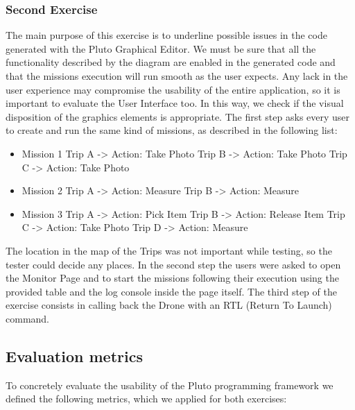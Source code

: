 \subsubsection{Second Exercise}

The main purpose of this exercise is to underline possible issues in the code generated with the Pluto Graphical Editor. We must be sure that all the functionality described by the diagram are enabled in the generated code and that the missions execution will run smooth as the user expects. Any lack in the user experience may compromise the usability of the entire application, so it is important to evaluate the User Interface too. In this way, we check if the visual disposition of the graphics elements is appropriate.
The first step asks every user to create and run the same kind of missions, as described in the following list:

\begin{itemize}
\item Mission 1
	\subitem Trip A -> Action: Take Photo
    \subitem Trip B -> Action: Take Photo
    \subitem Trip C -> Action: Take Photo
\item Mission 2
	\subitem Trip A -> Action: Measure
    \subitem Trip B -> Action: Measure
\item Mission 3
	\subitem Trip A -> Action: Pick Item
    \subitem Trip B -> Action: Release Item
    \subitem Trip C -> Action: Take Photo
    \subitem Trip D -> Action: Measure
\end{itemize}

The location in the map of the Trips was not important while testing, so the tester could decide any places.
In the second step the users were asked to open the Monitor Page and to start the missions following their execution using the provided table and the log console inside the page itself.
The third step of the exercise consists in calling back the Drone with an RTL (Return To Launch) command.


\subsection{Evaluation metrics}\label{metrics}

To concretely evaluate the usability of the Pluto programming framework we defined the following metrics, which we applied for both exercises:

